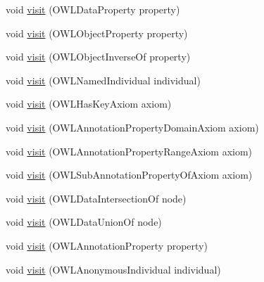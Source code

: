 \begin{DoxyCompactItemize}
void \hyperlink{classorg_1_1coode_1_1owlapi_1_1functionalrenderer_1_1_o_w_l_object_renderer_a8803809d7092315bce58e0f7013ccd62}{visit} (O\-W\-L\-Data\-Property property)
\item 
void \hyperlink{classorg_1_1coode_1_1owlapi_1_1functionalrenderer_1_1_o_w_l_object_renderer_a673a22c76fcaa4fbb057b65c167dd620}{visit} (O\-W\-L\-Object\-Property property)
\item 
void \hyperlink{classorg_1_1coode_1_1owlapi_1_1functionalrenderer_1_1_o_w_l_object_renderer_a42048310f2dd3472c3338c178f665724}{visit} (O\-W\-L\-Object\-Inverse\-Of property)
\item 
void \hyperlink{classorg_1_1coode_1_1owlapi_1_1functionalrenderer_1_1_o_w_l_object_renderer_a51b674f8a73b69647e3e0a01de7a2f74}{visit} (O\-W\-L\-Named\-Individual individual)
\item 
void \hyperlink{classorg_1_1coode_1_1owlapi_1_1functionalrenderer_1_1_o_w_l_object_renderer_af684aca159f1ddcf363825f1ae45b0c2}{visit} (O\-W\-L\-Has\-Key\-Axiom axiom)
\item 
void \hyperlink{classorg_1_1coode_1_1owlapi_1_1functionalrenderer_1_1_o_w_l_object_renderer_a8e9680f27cc2b0d82fd8c9ea256ce4a7}{visit} (O\-W\-L\-Annotation\-Property\-Domain\-Axiom axiom)
\item 
void \hyperlink{classorg_1_1coode_1_1owlapi_1_1functionalrenderer_1_1_o_w_l_object_renderer_a565262dc2d4f5837645c2aa538d552ea}{visit} (O\-W\-L\-Annotation\-Property\-Range\-Axiom axiom)
\item 
void \hyperlink{classorg_1_1coode_1_1owlapi_1_1functionalrenderer_1_1_o_w_l_object_renderer_abf38e873ac756e18d5b07521c8235515}{visit} (O\-W\-L\-Sub\-Annotation\-Property\-Of\-Axiom axiom)
\item 
void \hyperlink{classorg_1_1coode_1_1owlapi_1_1functionalrenderer_1_1_o_w_l_object_renderer_a83d2d1016a22c6cb41bd93237c5abed3}{visit} (O\-W\-L\-Data\-Intersection\-Of node)
\item 
void \hyperlink{classorg_1_1coode_1_1owlapi_1_1functionalrenderer_1_1_o_w_l_object_renderer_afe46337418434dd6d6b55f2ddbcc6823}{visit} (O\-W\-L\-Data\-Union\-Of node)
\item 
void \hyperlink{classorg_1_1coode_1_1owlapi_1_1functionalrenderer_1_1_o_w_l_object_renderer_a4979d2c31965333b5706b943a336d776}{visit} (O\-W\-L\-Annotation\-Property property)
\item 
void \hyperlink{classorg_1_1coode_1_1owlapi_1_1functionalrenderer_1_1_o_w_l_object_renderer_a8b3244a798550ea623599ae94252fa7e}{visit} (O\-W\-L\-Anonymous\-Individual individual)

\end{DoxyCompactItemize}
